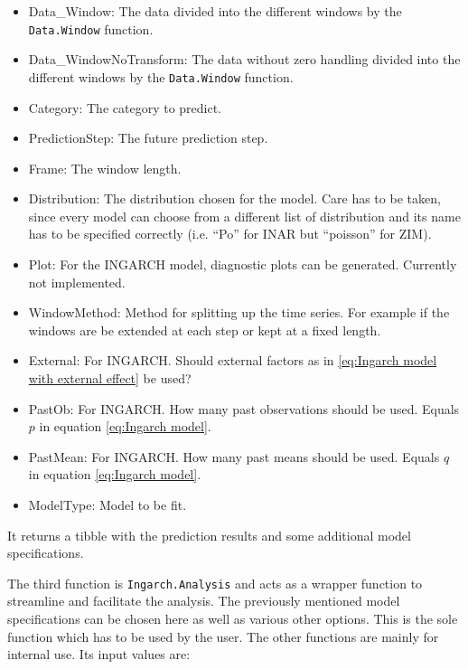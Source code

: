 \begin{itemize}
	\item Data\_Window: The data divided into the different windows by the \texttt{Data.Window} function.
	\item Data\_WindowNoTransform: The data without zero handling divided into the different windows by the \texttt{Data.Window} function.
  \item Category: The category to predict. 
  \item PredictionStep: The future prediction step.
  \item Frame: The window length.
  \item Distribution: The distribution chosen for the model. Care has to be taken, since every model can choose from a different list of distribution and its name has to be specified correctly (i.e. "`Po"' for INAR but "`poisson"' for ZIM). 
  \item Plot: For the INGARCH model, diagnostic plots can be generated. Currently not implemented.
  \item WindowMethod: Method for splitting up the time series. For example if the windows are be extended at each step or kept at a fixed length.
  \item External: For INGARCH. Should external factors as in \ref{eq:Ingarch model with external effect} be used?
  \item PastOb: For INGARCH. How many past observations should be used. Equals $p$ in equation \ref{eq:Ingarch model}.
  \item PastMean: For INGARCH. How many past means should be used. Equals $q$ in equation \ref{eq:Ingarch model}.
  \item ModelType: Model to be fit. 
\end{itemize}

It returns a tibble with the prediction results and some additional model specifications. 

The third function is \texttt{Ingarch.Analysis} and acts as a wrapper function to streamline and facilitate the analysis. The previously mentioned model specifications can be chosen here as well as various other options. This is the sole function which has to be used by the user. The other functions are mainly for internal use. Its input values are:

